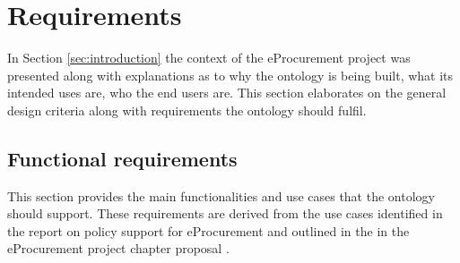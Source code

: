 \section{Requirements}
\label{sec:requirements}
	
	In Section \ref{sec:introduction} the context of the eProcurement project was presented along with explanations as to why the ontology is being built, what its intended uses are, who the end	users are. This section elaborates on the general design criteria along with requirements the ontology should fulfil.
	
	\subsection{Functional requirements}
	\label{sec:functional-requirements}	
	
	This section provides the main functionalities and use cases that the ontology should support. These requirements are derived from the use cases identified in the report on policy support for eProcurement \cite{d4.07-2016} and outlined in the in the eProcurement project chapter proposal \cite{d2.02-2017}.
	
